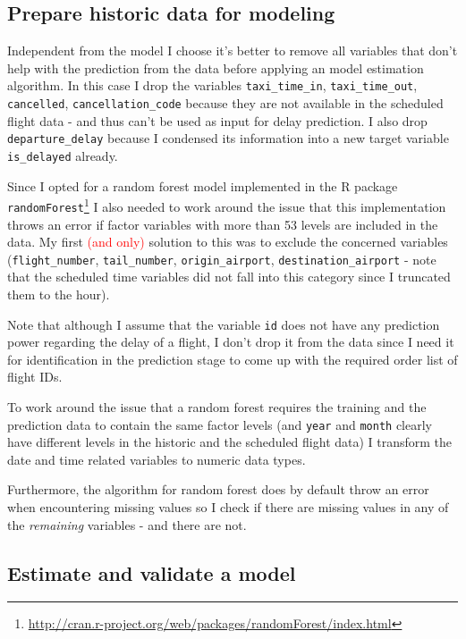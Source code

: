 \documentclass{article}
\begin{document}

\subsection{Prepare historic data for modeling} %
\label{sub:prepare_historic_data_for_modeling}
Independent from the model I choose it's better to remove all variables that don't help with the prediction from the data before applying an model estimation algorithm. In this case I drop the variables \verb+taxi_time_in+, \verb+taxi_time_out+, \verb+cancelled+, \verb+cancellation_code+ because they are not available in the scheduled flight data - and thus can't be used as input for delay prediction. I also drop \verb+departure_delay+ because I condensed its information into a new target variable \verb+is_delayed+ already.

Since I opted for a random forest model implemented in the R package \verb+randomForest+\footnote{\url{http://cran.r-project.org/web/packages/randomForest/index.html}} I also needed to work around the issue that this implementation throws an error if factor variables with more than 53 levels are included in the data. My first \textcolor{red}{(and only)} solution to this was to exclude the concerned variables (\verb+flight_number+, \verb+tail_number+, \verb+origin_airport+, \verb+destination_airport+ - note that the scheduled time variables did not fall into this category since I truncated them to the hour).

Note that although I assume that the variable \verb+id+ does not have any prediction power regarding the delay of a flight, I don't drop it from the data since I need it for identification in the prediction stage to come up with the required order list of flight IDs. 

To work around the issue that a random forest requires the training and the prediction data to contain the same factor levels (and \verb+year+ and \verb+month+ clearly have different levels in the historic and the scheduled flight data) I transform the date and time related variables to numeric data types.

Furthermore, the algorithm for random forest does by default throw an error when encountering missing values so I check if there are missing values in any of the \textit{remaining} variables - and there are not.


\subsection{Estimate and validate a model} %
\label{sub:estimate_and_validate_a_model}
\end{document}
